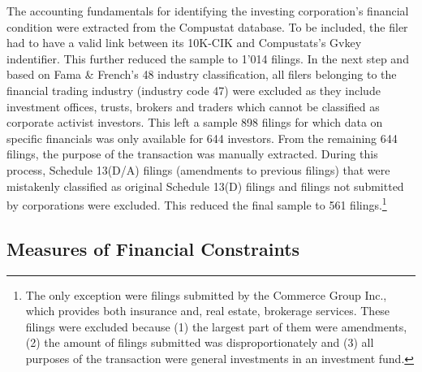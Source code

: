 \documentclass[12pt]{article}
\begin{document}
The accounting fundamentals for identifying the investing corporation's financial condition were extracted from the Compustat database. To be included, the filer had to have a valid link between its 10K-CIK and Compustats's Gvkey indentifier. This further reduced the sample to 1'014 filings. In the next step and based on Fama \& French's 48 industry classification, all filers belonging to the financial trading industry (industry code 47) were excluded as they include investment offices, trusts, brokers and traders which cannot be classified as corporate activist investors. This left a sample 898 filings for which data on specific financials was only available for 644 investors. From the remaining 644 filings, the purpose of the transaction was manually extracted. During this process, Schedule 13(D/A) filings (amendments to previous filings) that were mistakenly classified as original Schedule 13(D) filings and filings not submitted by corporations were excluded. This reduced the final sample to 561 filings.\footnote{The only exception were filings submitted by the Commerce Group Inc., which provides both insurance and, real estate, brokerage services. These filings were excluded because (1) the largest part of them were amendments, (2) the amount of filings submitted was disproportionately and (3) all purposes of the transaction were general investments in an investment fund.} 

\subsection{Measures of Financial Constraints}
\end{document}
